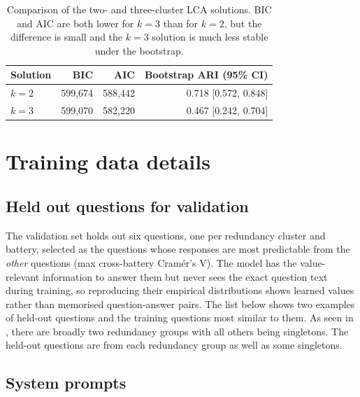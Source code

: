 \begin{table}[htbp]
  \centering
  \caption{Comparison of the two- and three-cluster LCA solutions. BIC and AIC are both lower for $k=3$ than for $k=2$, but the difference is small and the $k=3$ solution is much less stable under the bootstrap.}
  \label{tab:cluster-summary}
  \begin{tabular}{@{}lrrr@{}}
    \toprule
    Solution & BIC & AIC & Bootstrap ARI (95\% CI) \\
    \midrule
    $k=2$ & 599{,}674 & 588{,}442 & 0.718 [0.572, 0.848] \\
    $k=3$ & 599{,}070 & 582{,}220 & 0.467 [0.242, 0.704] \\
    \bottomrule
  \end{tabular}
\end{table}


\section{Training data details}

\subsection{Held out questions for validation}

The validation set holds out six questions, one per redundancy cluster and
battery, selected as the questions whose responses are most predictable from
the \emph{other} questions (max cross-battery Cram\'er's V). The model has the
value-relevant information to answer them but never sees the exact question
text during training, so reproducing their empirical distributions shows
learned values rather than memorised question-answer pairs. The list below
shows two examples of held-out questions and the training questions most similar to them. As seen in , there are broadly two redundancy groups with all others being singletons. The held-out questions are from each redundancy group as well as some singletons.

{\small}


\subsection{System prompts}
\label{sec:system-prompts}

